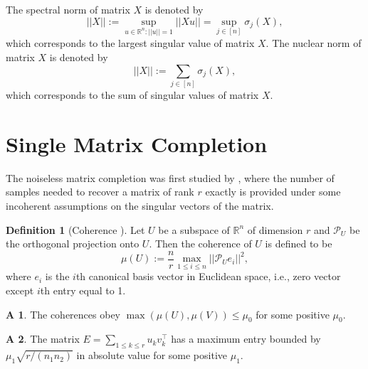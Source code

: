 \documentclass{article} %
\theoremstyle{definition}
\newtheorem{definition}{Definition}
\newtheorem{assumption}{A}
\newcommand\mc{\mathcal} %
\begin{document}
The spectral norm of matrix $X$ is denoted by
\begin{equation}
||X|| := \sup_{u\in \mathbb{R}^n:||u||=1}||Xu|| = \sup_{j\in[n]}\sigma_j(X),
\end{equation}
which corresponds to the largest singular value of matrix $X$. The nuclear norm of matrix $X$ is denoted by
\begin{equation}
||X|| := \sum_{j\in[n]}\sigma_j(X),
\end{equation}
which corresponds to the sum of singular values of matrix $X$.

\section{Single Matrix Completion}
The noiseless matrix completion was first studied by \cite{candes2009exact}, where the number of samples needed to recover a matrix of rank $r$ exactly is provided under some incoherent assumptions on the singular vectors of the matrix.
\begin{definition}[Coherence \cite{candes2009exact}]
Let $U$ be a subspace of $\mathbb{R}^n$ of dimension $r$ and $\mc{P}_U$ be the orthogonal projection onto $U$. Then the coherence of $U$ is defined to be
\begin{equation}
\mu(U) := \frac{n}{r}\max_{1\leq i \leq n}||\mc{P}_Ue_i||^2,
\end{equation}
where $e_i$ is the $i$th canonical basis vector in Euclidean space, i.e., zero vector except $i$th entry equal to 1.
\end{definition}

\begin{assumption}
The coherences obey $\max(\mu(U),\mu(V)) \leq \mu_0$ for some positive $\mu_0$.
\end{assumption}
\begin{assumption}
The matrix $E=\sum_{1\leq k \leq r} u_k v_k^\top$ has a maximum entry bounded by $\mu_1 \sqrt{r/(n_1n_2)}$ in absolute value for some positive $\mu_1$.
\end{assumption}
\end{document}
